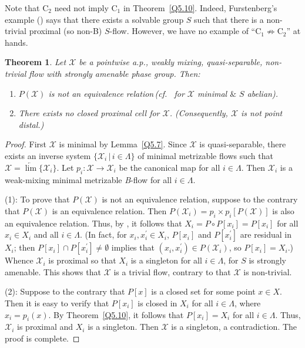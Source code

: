 \documentclass[12pt,final,3p,times]{elsarticle}
\newtheorem{sthm}{Theorem}[subsection]
\theoremstyle{definition}
\numberwithin{equation}{section}
\begin{document}
Note that $\mathrm{C}_2$ need not imply $\mathrm{C}_1$ in Theorem~\ref{Q5.10}. Indeed, Furstenberg's example (\cite[II.5.5]{G76}) says that there exists a solvable group $S$ such that there is a non-trivial proximal (so non-B) $S$-flow. However, we have no example of ``$\mathrm{C}_1\not\Rightarrow\mathrm{C}_2$'' at hands.

\begin{sthm}\label{Q5.11}
Let $\mathscr{X}$ be a pointwise a.p., weakly mixing, quasi-separable, non-trivial flow with strongly amenable phase group. Then:
\begin{enumerate}[(1)]
\item $P(\mathscr{X})$ is not an equivalence relation\,(cf.~\cite[Prop.~2.3]{K71} for $\mathscr{X}$ minimal $\&$ $S$ abelian).
\item There exists no closed proximal cell for $\mathscr{X}$. (Consequently, $\mathscr{X}$ is not point distal.)
\end{enumerate}
\end{sthm}

\begin{proof}
First $\mathscr{X}$ is minimal by Lemma~\ref{Q5.7}. Since $\mathscr{X}$ is quasi-separable, there exists an inverse system $\{\mathscr{X}_i\,|\,i\in\Lambda\}$ of minimal metrizable flows such that $\mathscr{X}=\underleftarrow{\lim}\{\mathscr{X}_i\}$. Let $p_i\colon\mathscr{X}\rightarrow\mathscr{X}_i$ be the canonical map for all $i\in\Lambda$. Then $\mathscr{X}_i$ is a weak-mixing minimal metrizable \textsl{B}-flow for all $i\in\Lambda$.

(1): To prove that $P(\mathscr{X})$ is not an equivalence relation, suppose to the contrary that $P(\mathscr{X})$ is an equivalence relation. Then $P(\mathscr{X}_i)=p_i\times p_i[P(\mathscr{X})]$ is also an equivalence relation. Thus, by \cite[Cor.~2.14]{MW74}, it follows that $X_i=P\circ P[x_i]=P[x_i]$ for all $x_i\in X_i$ and all $i\in\Lambda$. (In fact, for $x_i,x_i^\prime\in X_i$, $P[x_i]$ and $P[x_i^\prime]$ are residual in $X_i$; then $P[x_i]\cap P[x_i^\prime]\not=\emptyset$ implies that $(x_i,x_i^\prime)\in P(\mathscr{X}_i)$, so $P[x_i]=X_i$.) Whence $\mathscr{X}_i$ is proximal so that $X_i$ is a singleton for all $i\in\Lambda$, for $S$ is strongly amenable. This shows that $\mathscr{X}$ is a trivial flow, contrary to that $\mathscr{X}$ is non-trivial.

(2): Suppose to the contrary that $P[x]$ is a closed set for some point $x\in X$. Then it is easy to verify that $P[x_i]$ is closed in $X_i$ for all $i\in\Lambda$, where $x_i=p_i(x)$. By Theorem~\ref{Q5.10}, it follows that $P[x_i]=X_i$ for all $i\in\Lambda$. Thus, $\mathscr{X}_i$ is proximal and $X_i$ is a singleton. Then $\mathscr{X}$ is a singleton, a contradiction.
The proof is complete.
\end{proof}
\end{document}
